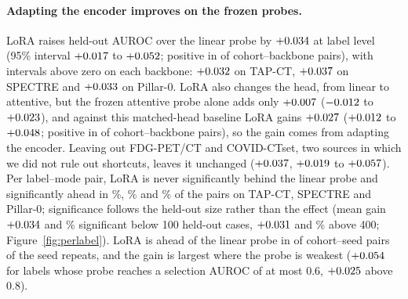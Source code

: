 \paragraph{Adapting the encoder improves on the frozen probes.} LoRA raises held-out AUROC over the linear probe by $+0.034$ at label level (95\% interval $+0.017$ to $+0.052$; positive in \numCiClsloralinAllPosN{} of \numCiClsloralinAllClustersN{} cohort--backbone pairs), with intervals above zero on each backbone: $+0.032$ on TAP-CT, $+0.037$ on SPECTRE and $+0.033$ on Pillar-0. LoRA also changes the head, from linear to attentive, but the frozen attentive probe alone adds only $+0.007$ ($-0.012$ to $+0.023$), and against this matched-head baseline LoRA gains $+0.027$ ($+0.012$ to $+0.048$; positive in \numCiClsloraattnAllPosN{} of \numCiClsloraattnAllClustersN{} cohort--backbone pairs), so the gain comes from adapting the encoder. Leaving out FDG-PET/CT and COVID-CTset, two sources in which we did not rule out shortcuts, leaves it unchanged ($+0.037$, $+0.019$ to $+0.057$). Per label--mode pair, LoRA is never significantly behind the linear probe and significantly ahead in \numPairedTapctLinLoraSigbetter\%, \numPairedSpectreLinLoraSigbetter\% and \numPairedPillarZLinLoraSigbetter\% of the pairs on TAP-CT, SPECTRE and Pillar-0; significance follows the held-out size rather than the effect (mean gain $+0.034$ and \numSigbysizeSmallSig\% significant below 100 held-out cases, $+0.031$ and \numSigbysizeLargeSig\% above 400; Figure~\ref{fig:perlabel}). LoRA is ahead of the linear probe in \numSeedsclsLoraLinAllPosN{} of \numSeedsclsLoraLinAllPairsN{} cohort--seed pairs of the seed repeats, and the gain is largest where the probe is weakest ($+0.054$ for labels whose probe reaches a selection AUROC of at most 0.6, $+0.025$ above 0.8).

